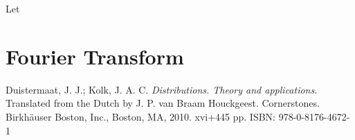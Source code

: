 \documentclass[twoside, a4paper, 10pt]{amsart}
\begin{document}
\begin{mydef} Let 

\end{mydef}

\section{Fourier Transform}


\begin{thebibliography}{99}

 Duistermaat, J. J.; Kolk, J. A. C. \emph{Distributions. Theory and applications.} Translated from the Dutch by J. P. van Braam Houckgeest. Cornerstones. Birkhäuser Boston, Inc., Boston, MA, 2010. xvi+445 pp. ISBN: 978-0-8176-4672-1 

\end{thebibliography} 
\end{document}
